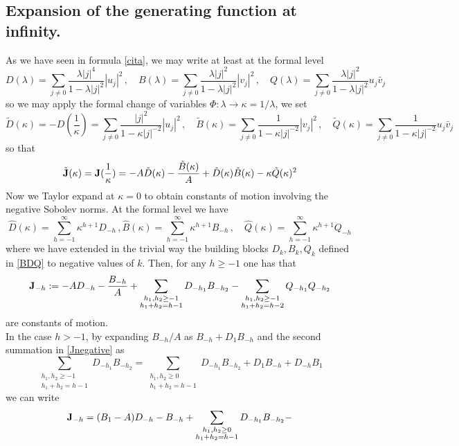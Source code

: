 \documentclass[reqno,11pt]{amsart}
\theoremstyle{plain}
\numberwithin{equation}{section}
\newcommand{\I}{{\texttt{\bf J}}}
\begin{document}
{\subsection{Expansion of the generating function at infinity.}
As we have seen in formula  \ref{cita}, we may write at least at the formal level
\[
D(\lambda) = \sum_{j \neq 0} \frac{\lambda |j|^4}{1 - \lambda |j|^2} |u_j|^2 \,,\quad B(\lambda) = \sum_{j \neq 0} \frac{\lambda |j|^2}{1 - \lambda |j|^2} |v_j|^2 \,,\quad Q(\lambda) = \sum_{j \neq 0} \frac{\lambda |j|^2}{1 - \lambda |j|^2}{ u_j \bar v_j }
\]
so we may apply the formal change of variables $\Phi:\lambda\to \kappa= 1/\lambda$, we set
\[
\tilde D(\kappa) = -D(\frac1\kappa) = \sum_{j \neq 0} \frac{ |j|^2}{1 - \kappa |j|^{-2}} |u_j|^2 \,,\quad \tilde B(\kappa) =  \sum_{j \neq 0} \frac{ 1}{1 - \kappa |j|^{-2}} |v_j|^2 \,,\quad  \tilde Q(\kappa) =  \sum_{j \neq 0} \frac{ 1}{1 - \kappa |j|^{-2}} u_j\bar v_j 
\]
so that
\[
\tilde \I(\kappa)=\I(\frac1\kappa) = - A \tilde D(\kappa) -\frac{\tilde B(\kappa)}{A} + \tilde D(\kappa) \tilde B(\kappa) -\kappa \tilde Q(\kappa)^2
\]
Now we Taylor expand at $\kappa=0$ to obtain constants of motion involving the negative Sobolev norms.
At the formal level we have 
\[
\hat D(\kappa) =\sum_{h=-1}^\infty \kappa^{h+1} D_{-h}\,, \hat B(\kappa) =\sum_{h=-1}^\infty \kappa^{h+1} B_{-h}\,,\quad \hat Q(\kappa) =\sum_{h=-1}^\infty \kappa^{h+1} Q_{-h}
\]
where we have extended in the trivial way the building blocks $D_k,B_k,Q_k$  defined in \ref{BDQ} to negative values of $k$.
Then, for any $h\geq -1$ one has that
\begin{equation}\label{Jnegative}
	\I_{-h}:= - A  D_{-h} -\frac{ B_{-h}}{A} + \sum_{\substack{h_1,h_2\geq -1\\ h_1+h_2= h-1}}  D_{-h_1}B_{-h_2} -
	\sum_{\substack{h_1,h_2\geq -1\\ h_1+h_2= h-2}} Q_{-h_1} Q_{-h_2} 
\end{equation}
are constants of motion.\\
In the case $h>-1$, by expanding $B_{-h}/A$ as $B_{-h}+D_1B_{-h}$ and the second summation in \eqref{Jnegative} as
\begin{equation*}
	\sum_{\substack{h_1,h_2\geq -1\\ h_1+h_2= h-1}}  D_{-h_1}B_{-h_2}=\sum_{\substack{h_1,h_2\geq 0\\ h_1+h_2= h-1}}  D_{-h_1}B_{-h_2}+
	D_1B_{-h}+D_{-h}B_1
\end{equation*}
we can write
\begin{equation*}
	\I_{-h}= (B_1-A)D_{-h} -B_{-h} + \sum_{\substack{h_1,h_2\geq 0\\ h_1+h_2= h-1}}  D_{-h_1}B_{-h_2} -

\end{equation*}}
\end{document}
